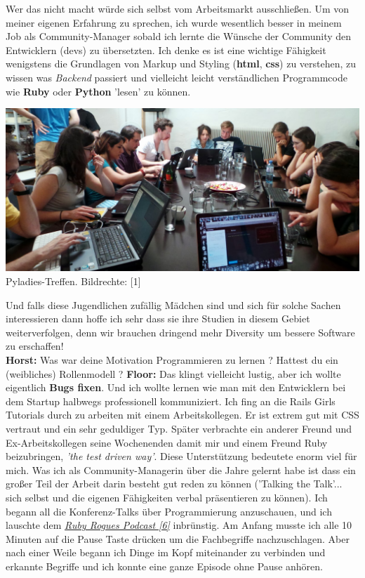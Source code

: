 Wer das nicht macht würde sich selbst vom Arbeitsmarkt ausschließen. Um von meiner eigenen Erfahrung zu sprechen, ich wurde wesentlich besser in meinem Job als Community-Manager sobald ich lernte die Wünsche der Community den Entwicklern (devs) zu übersetzten. Ich denke es ist eine  wichtige Fähigkeit wenigstens die Grundlagen von Markup und Styling (\textbf{html}, \textbf{css}) zu verstehen, zu wissen was \textit{Backend} passiert und vielleicht leicht verständlichen Programmcode wie \textbf{Ruby} oder \textbf{Python} 'lesen' zu können. 
\begin{center}
\includegraphics[width=\linewidth]{floor/floor5a.jpg} \\
\footnotesize{Pyladies-Treffen. Bildrechte: [1]} 
\end{center}
Und falls diese Jugendlichen zufällig Mädchen sind und sich für solche Sachen interessieren dann hoffe ich sehr dass sie ihre Studien in diesem Gebiet weiterverfolgen, denn wir brauchen dringend mehr Diversity um bessere Software zu erschaffen! \\
\textbf{Horst:} Was war deine Motivation Programmieren zu lernen ? Hattest du ein (weibliches) Rollenmodell ?
\textbf{Floor:} Das klingt vielleicht lustig, aber ich wollte eigentlich \textbf{Bugs fixen}. Und ich wollte lernen wie man mit den Entwicklern bei dem Startup halbwegs professionell kommuniziert. 
Ich fing an die Rails Girls Tutorials durch zu arbeiten mit einem Arbeitskollegen. Er ist extrem gut mit CSS vertraut und ein sehr geduldiger Typ. Später verbrachte ein anderer Freund und Ex-Arbeitskollegen seine Wochenenden damit mir und einem Freund Ruby beizubringen, \textit{'the test driven way'}. Diese Unterstützung bedeutete enorm viel für mich.
Was ich als Community-Managerin über die Jahre gelernt habe ist dass ein großer Teil der Arbeit darin besteht gut reden zu können ('Talking the Talk'... sich selbst und die eigenen Fähigkeiten verbal präsentieren zu können). Ich begann all die Konferenz-Talks über Programmierung anzuschauen, und ich lauschte dem \href{http://rubyrogues.com/}{\textit{Ruby Rogues Podcast [6]}} inbrünstig. Am Anfang musste ich alle 10 Minuten auf die Pause Taste drücken um die Fachbegriffe nachzuschlagen. Aber nach einer Weile begann ich Dinge im Kopf miteinander zu verbinden und erkannte Begriffe und ich konnte eine ganze Episode ohne Pause anhören. 
